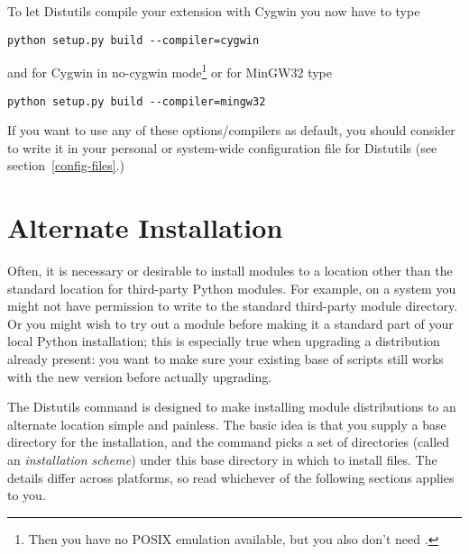 \documentclass{howto}
\begin{document}
To let Distutils compile your extension with Cygwin you now have to type

\begin{verbatim}
python setup.py build --compiler=cygwin
\end{verbatim}

and for Cygwin in no-cygwin mode\footnote{Then you have no POSIX emulation
available, but you also don't need .} or for MinGW32 type
 
\begin{verbatim}
python setup.py build --compiler=mingw32
\end{verbatim}

If you want to use any of these options/compilers as default, you should
consider to write it in your personal or system-wide configuration file
for Distutils (see section~\ref{config-files}.)




\section{Alternate Installation}
\label{alt-install}

Often, it is necessary or desirable to install modules to a location
other than the standard location for third-party Python modules.  For
example, on a \UNIX{} system you might not have permission to write to the
standard third-party module directory.  Or you might wish to try out a
module before making it a standard part of your local Python
installation; this is especially true when upgrading a distribution
already present: you want to make sure your existing base of scripts
still works with the new version before actually upgrading.

The Distutils  command is designed to make installing
module distributions to an alternate location simple and painless.  The
basic idea is that you supply a base directory for the installation, and
the  command picks a set of directories (called an
\emph{installation scheme}) under this base directory in which to
install files.  The details differ across platforms, so read whichever
of the following sections applies to you.
\end{document}
